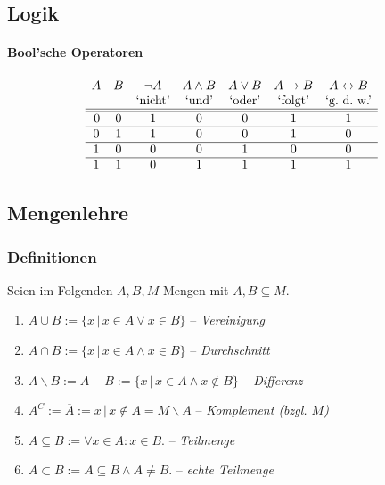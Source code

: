 \documentclass[a4paper, 9pt, DIV=24]{scrartcl}
\begin{document}
\subsection{Logik}
\paragraph{Bool'sche Operatoren}
\[
\begin{array}{ccccccc}
A&B&\neg A&A \wedge B&A \vee B & A \rightarrow B & A \leftrightarrow B \\
&& \text{`nicht'} & \text{`und'} & \text{`oder'} & \text{`folgt'} & \text{`g.\ d.\ w.'} \\\hline\hline\hspace{.1em}
0&0&1&0&0&1&1\\\hline
0&1&1&0&0&1&0\\\hline
1&0&0&0&1&0&0\\\hline
1&1&0&1&1&1&1\\
\end{array}
\]

\subsection{Mengenlehre}
\subsubsection{Definitionen}
Seien im Folgenden $A, B, M$ Mengen mit $A, B \subseteq M$.
\begin{enumerate}[label={(}\arabic*{)}]
 \item $A \cup B := \{x\, |\, x \in A \lor x \in B\}$ -- \emph{Vereinigung}
 \item $A \cap B := \{x\, |\, x \in A \land x \in B\}$ -- \emph{Durchschnitt}
 \item $A \backslash B := A - B := \{x\, |\, x \in A \wedge x \notin B\}$ -- \emph{Differenz}
 \item $A^C := \overline{A} := {x\, |\, x \notin A} = M \backslash A$ -- \emph{Komplement (bzgl. $M$)}
 \item $A \subseteq B := \forall x \in A: x \in B.$ -- \emph{Teilmenge}
 \item $A \subset B := A \subseteq B \wedge A \neq B.$ -- \emph{echte Teilmenge}
\end{enumerate}
\end{document}
